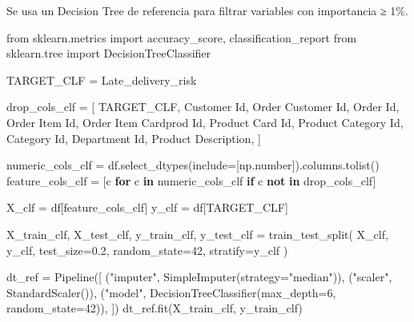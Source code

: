 \documentclass[
  letterpaper,
  DIV=11,
  numbers=noendperiod]{scrartcl}
\newenvironment{Shaded}{\begin{snugshade}}{\end{snugshade}}
\newcommand{\ControlFlowTok}[1]{\textcolor[rgb]{0.00,0.23,0.31}{\textbf{#1}}}
\newcommand{\DecValTok}[1]{\textcolor[rgb]{0.68,0.00,0.00}{#1}}
\newcommand{\FloatTok}[1]{\textcolor[rgb]{0.68,0.00,0.00}{#1}}
\newcommand{\ImportTok}[1]{\textcolor[rgb]{0.00,0.46,0.62}{#1}}
\newcommand{\KeywordTok}[1]{\textcolor[rgb]{0.00,0.23,0.31}{\textbf{#1}}}
\newcommand{\NormalTok}[1]{\textcolor[rgb]{0.00,0.23,0.31}{#1}}
\newcommand{\OperatorTok}[1]{\textcolor[rgb]{0.37,0.37,0.37}{#1}}
\newcommand{\StringTok}[1]{\textcolor[rgb]{0.13,0.47,0.30}{#1}}
\begin{document}
Se usa un Decision Tree de referencia para filtrar variables con
importancia ≥ 1\%.

\protect{}\label{clf-feature-selection}
\begin{Shaded}
\begin{Highlighting}[]
\ImportTok{from}\NormalTok{ sklearn.metrics }\ImportTok{import}\NormalTok{ accuracy\_score, classification\_report}
\ImportTok{from}\NormalTok{ sklearn.tree }\ImportTok{import}\NormalTok{ DecisionTreeClassifier}

\NormalTok{TARGET\_CLF }\OperatorTok{=} \StringTok{\textquotesingle{}Late\_delivery\_risk\textquotesingle{}}

\NormalTok{drop\_cols\_clf }\OperatorTok{=}\NormalTok{ [}
\NormalTok{    TARGET\_CLF,}
    \StringTok{\textquotesingle{}Customer Id\textquotesingle{}}\NormalTok{, }\StringTok{\textquotesingle{}Order Customer Id\textquotesingle{}}\NormalTok{, }\StringTok{\textquotesingle{}Order Id\textquotesingle{}}\NormalTok{,}
    \StringTok{\textquotesingle{}Order Item Id\textquotesingle{}}\NormalTok{, }\StringTok{\textquotesingle{}Order Item Cardprod Id\textquotesingle{}}\NormalTok{,}
    \StringTok{\textquotesingle{}Product Card Id\textquotesingle{}}\NormalTok{, }\StringTok{\textquotesingle{}Product Category Id\textquotesingle{}}\NormalTok{, }\StringTok{\textquotesingle{}Category Id\textquotesingle{}}\NormalTok{, }\StringTok{\textquotesingle{}Department Id\textquotesingle{}}\NormalTok{,}
    \StringTok{\textquotesingle{}Product Description\textquotesingle{}}\NormalTok{,}
\NormalTok{]}

\NormalTok{numeric\_cols\_clf }\OperatorTok{=}\NormalTok{ df.select\_dtypes(include}\OperatorTok{=}\NormalTok{[np.number]).columns.tolist()}
\NormalTok{feature\_cols\_clf }\OperatorTok{=}\NormalTok{ [c }\ControlFlowTok{for}\NormalTok{ c }\KeywordTok{in}\NormalTok{ numeric\_cols\_clf }\ControlFlowTok{if}\NormalTok{ c }\KeywordTok{not} \KeywordTok{in}\NormalTok{ drop\_cols\_clf]}

\NormalTok{X\_clf }\OperatorTok{=}\NormalTok{ df[feature\_cols\_clf]}
\NormalTok{y\_clf }\OperatorTok{=}\NormalTok{ df[TARGET\_CLF]}

\NormalTok{X\_train\_clf, X\_test\_clf, y\_train\_clf, y\_test\_clf }\OperatorTok{=}\NormalTok{ train\_test\_split(}
\NormalTok{    X\_clf, y\_clf, test\_size}\OperatorTok{=}\FloatTok{0.2}\NormalTok{, random\_state}\OperatorTok{=}\DecValTok{42}\NormalTok{, stratify}\OperatorTok{=}\NormalTok{y\_clf}
\NormalTok{)}

\NormalTok{dt\_ref }\OperatorTok{=}\NormalTok{ Pipeline([}
\NormalTok{    (}\StringTok{"imputer"}\NormalTok{, SimpleImputer(strategy}\OperatorTok{=}\StringTok{"median"}\NormalTok{)),}
\NormalTok{    (}\StringTok{"scaler"}\NormalTok{,  StandardScaler()),}
\NormalTok{    (}\StringTok{"model"}\NormalTok{,   DecisionTreeClassifier(max\_depth}\OperatorTok{=}\DecValTok{6}\NormalTok{, random\_state}\OperatorTok{=}\DecValTok{42}\NormalTok{)),}
\NormalTok{])}
\NormalTok{dt\_ref.fit(X\_train\_clf, y\_train\_clf)}


\end{Highlighting}
\end{Shaded}
\end{document}
